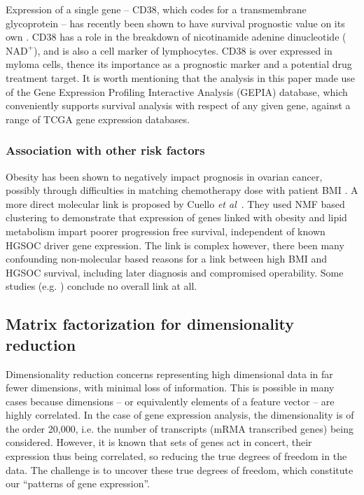 \documentclass[draft,tikz, 12pt,a4paper,oneside,fleqn]{article}
\newcommand{\etal}{{\em et al\/}}
\begin{document}
Expression of a single gene -- CD38, which codes for a transmembrane glycoprotein -- has recently been shown to have survival prognostic value on its own \cite{Zhu2020}.
CD38 has a role in the breakdown of nicotinamide adenine dinucleotide ($\mbox{NAD}^+$), and is also a cell marker of lymphocytes.
CD38 is over expressed in myloma cells, thence its importance as a prognostic marker and a potential drug treatment target.  
It is worth mentioning that the analysis in this paper made use of the Gene Expression Profiling Interactive Analysis (GEPIA) database, which conveniently supports survival analysis with respect of any given gene, against a range of TCGA gene expression databases.

\subsubsection{Association with other risk factors}

Obesity has been shown to negatively impact prognosis in ovarian cancer, possibly through difficulties in matching chemotherapy dose with patient BMI  \cite{Au-Yeung2014}.  A more direct molecular link is proposed by Cuello \etal\ \cite{Cuello2018}.  They used NMF based clustering to demonstrate that expression of genes linked with obesity and lipid metabolism impart poorer progression free survival, independent of known HGSOC driver gene expression.  The link is complex however, there been many confounding non-molecular based reasons for a link between high BMI and HGSOC survival, including later diagnosis and compromised operability.  Some studies (e.g. \cite{Hew2013}) conclude no overall link at all.




\subsection{Matrix factorization for dimensionality reduction}
\label{sec-matrix-factorization-intro}

Dimensionality reduction concerns representing high dimensional data in far fewer dimensions, with minimal loss of information.  This is possible in many cases because dimensions -- or equivalently elements of a feature vector -- are highly correlated.  In the case of gene expression analysis, the dimensionality is of the order 20,000, i.e. the number of transcripts (mRMA transcribed genes) being considered.  However, it is known that sets of genes act in concert, their expression thus being correlated, so reducing the true degrees of freedom in the data.  The challenge is to uncover these true degrees of freedom, which constitute our ``patterns of gene expression''.
\end{document}

